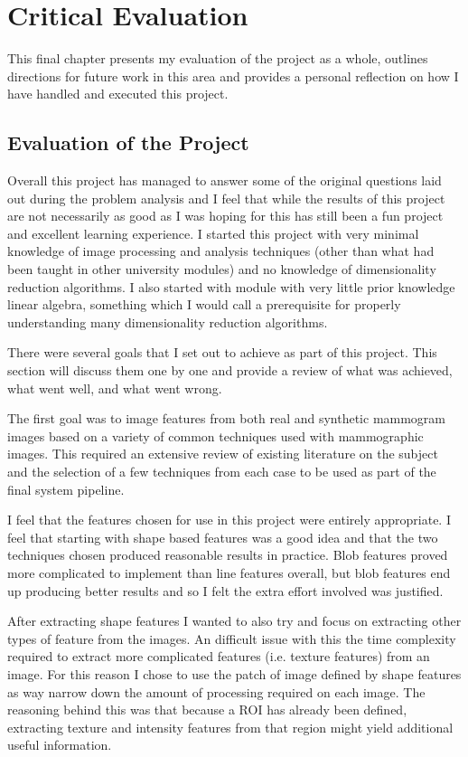 \chapter{Critical Evaluation}
This final chapter presents my evaluation of the project as a whole, outlines directions for future work in this area and provides a personal reflection on how I have handled and executed this project.

\section{Evaluation of the Project}
Overall this project has managed to answer some of the original questions laid out during the problem analysis and I feel that while the results of this project are not necessarily  as good as I was hoping for this has still been a fun project and excellent learning experience. I started this project with very minimal knowledge of image processing and analysis techniques (other than what had been taught in other university modules) and no knowledge of dimensionality reduction algorithms. I also started with module with very little prior knowledge linear algebra, something which I would call a prerequisite for properly understanding many dimensionality reduction algorithms.

There were several goals that I set out to achieve as part of this project. This section will discuss them one by one and provide a review of what was achieved, what went well, and what went wrong.

The first goal was to image features from both real and synthetic mammogram images based on a variety of common techniques used with mammographic images. This required an extensive review of existing literature on the subject and the selection of a few techniques from each case to be used as part of the final system pipeline.

I feel that the features chosen for use in this project were entirely appropriate. I feel that starting with shape based features was a good idea and that the two techniques chosen produced reasonable results in practice. Blob features proved more complicated to implement than line features overall, but blob features end up producing better results and so I felt the extra effort involved was justified. 

After extracting shape features I wanted to also try and focus on extracting other types of feature from the images. An difficult issue with this the time complexity required to extract more complicated features (i.e. texture features) from an image. For this reason I chose to use the patch of image defined by shape features as way narrow down the amount of processing required on each image. The reasoning behind this was that because a ROI has already been defined, extracting texture and intensity features from that region might yield additional useful information. 

